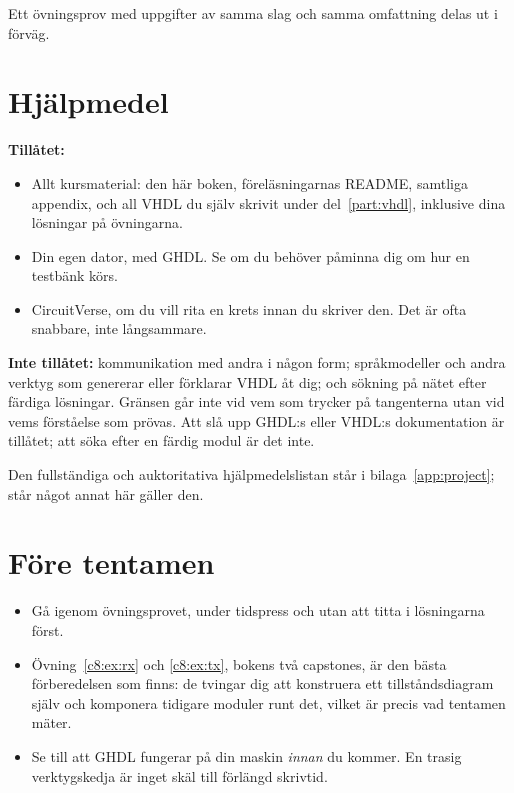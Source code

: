 Ett övningsprov med uppgifter av samma slag och samma omfattning delas ut i förväg.

\section{Hjälpmedel}
\label{c9:sec:aids}

\textbf{Tillåtet:}
\begin{itemize}
  \item Allt kursmaterial: den här boken, föreläsningarnas README, samtliga appendix, och all VHDL
    du själv skrivit under del~\ref{part:vhdl}, inklusive dina lösningar på övningarna.
  \item Din egen dator, med GHDL. Se  om du behöver påminna dig om hur en
    testbänk körs.
  \item CircuitVerse, om du vill rita en krets innan du skriver den. Det är ofta snabbare, inte
    långsammare.
\end{itemize}

\textbf{Inte tillåtet:} kommunikation med andra i någon form; språkmodeller och andra verktyg som
genererar eller förklarar VHDL åt dig; och sökning på nätet efter färdiga lösningar. Gränsen går
inte vid vem som trycker på tangenterna utan vid vems förståelse som prövas. Att slå upp GHDL:s
eller VHDL:s dokumentation är tillåtet; att söka efter en färdig modul är det inte.

Den fullständiga och auktoritativa hjälpmedelslistan står i bilaga~\ref{app:project}; står något
annat här gäller den.

\section{Före tentamen}
\label{c9:sec:prep}

\begin{itemize}
  \item Gå igenom övningsprovet, under tidspress och utan att titta i lösningarna först.
  \item Övning~\ref{c8:ex:rx} och \ref{c8:ex:tx}, bokens två capstones, är den bästa förberedelsen
    som finns: de tvingar dig att konstruera ett tillståndsdiagram själv och komponera tidigare
    moduler runt det, vilket är precis vad tentamen mäter.
  \item Se till att GHDL fungerar på din maskin \emph{innan} du kommer. En trasig verktygskedja är
    inget skäl till förlängd skrivtid.
\end{itemize}

